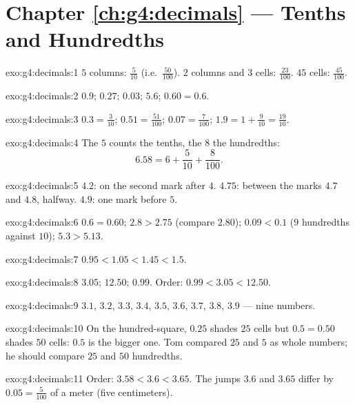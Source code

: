 \section*{Chapter \ref{ch:g4:decimals} --- Tenths and Hundredths}

\begin{solution}{exo:g4:decimals:1}
$5$ columns: $\frac{5}{10}$ (i.e.\ $\frac{50}{100}$). $2$ columns
and $3$ cells: $\frac{23}{100}$. $45$ cells: $\frac{45}{100}$.
\end{solution}

\begin{solution}{exo:g4:decimals:2}
$0.9$; \quad $0.27$; \quad $0.03$; \quad $5.6$; \quad
$0.60 = 0.6$.
\end{solution}

\begin{solution}{exo:g4:decimals:3}
$0.3 = \frac{3}{10}$; \quad $0.51 = \frac{51}{100}$; \quad
$0.07 = \frac{7}{100}$; \quad $1.9 = 1 + \frac{9}{10} =
\frac{19}{10}$.
\end{solution}

\begin{solution}{exo:g4:decimals:4}
The $5$ counts the tenths, the $8$ the hundredths:
\[
6.58 = 6 + \frac{5}{10} + \frac{8}{100}.
\]
\end{solution}

\begin{solution}{exo:g4:decimals:5}
$4.2$: on the second mark after $4$. $4.75$: between the marks
$4.7$ and $4.8$, halfway. $4.9$: one mark before $5$.
\end{solution}

\begin{solution}{exo:g4:decimals:6}
$0.6 = 0.60$; \quad $2.8 > 2.75$ (compare $2.80$); \quad
$0.09 < 0.1$ ($9$ hundredths against $10$); \quad
$5.3 > 5.13$.
\end{solution}

\begin{solution}{exo:g4:decimals:7}
$0.95 < 1.05 < 1.45 < 1.5$.
\end{solution}

\begin{solution}{exo:g4:decimals:8}
$3.05$; \quad $12.50$; \quad $0.99$. Order:
$0.99 < 3.05 < 12.50$.
\end{solution}

\begin{solution}{exo:g4:decimals:9}
$3.1$, $3.2$, $3.3$, $3.4$, $3.5$, $3.6$, $3.7$, $3.8$, $3.9$ ---
nine numbers.
\end{solution}

\begin{solution}{exo:g4:decimals:10}
On the hundred-square, $0.25$ shades $25$ cells but $0.5 = 0.50$
shades $50$ cells: $0.5$ is the bigger one. Tom compared $25$ and
$5$ as whole numbers; he should compare $25$ and $50$ hundredths.
\end{solution}

\begin{solution}{exo:g4:decimals:11}
Order: $3.58 < 3.6 < 3.65$. The jumps $3.6$ and $3.65$ differ by
$0.05 = \frac{5}{100}$ of a meter (five centimeters).
\end{solution}
